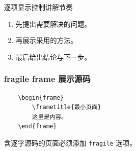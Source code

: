\documentclass[aspectratio=169,11pt]{beamer}
\newenvironment{codeslide}
    {\begin{frame}[fragile,environment=codeslide]}
    {\end{frame}}
\begin{document}
\begin{frame}{逐项显示控制讲解节奏}
    \begin{enumerate}
        \item 先提出需要解决的问题。
        \pause
        \item 再展示采用的方法。
        \pause
        \item 最后给出结论与下一步。
    \end{enumerate}
\end{frame}

\begin{codeslide}
    \frametitle{fragile frame 展示源码}
    \begin{verbatim}
    \begin{frame}
        \frametitle{最小页面}
        这里是内容。
    \end{frame}
    \end{verbatim}

    \small 含逐字源码的页面必须添加 \texttt{fragile} 选项。
\end{codeslide}
\end{document}
